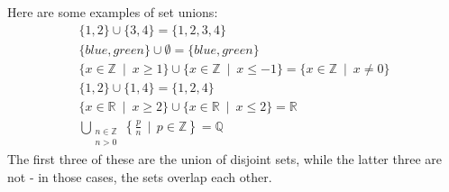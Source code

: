 \documentclass[12pt]{article}
\renewcommand{\geq}{\geqslant}
\renewcommand{\leq}{\leqslant}
\newcommand{\Ints}{\mathbb{Z}}
\newcommand{\Rats}{\mathbb{Q}}
\newcommand{\Reals}{\mathbb{R}}
\begin{document}
Here are some examples of set unions:
\begin{gather*}
\{1,2\}\cup\{3,4\} = \{1,2,3,4\}\\
\{blue, green\}\cup\emptyset = \{blue, green\}\\
\{x\in\Ints\ \mid\ x\geq 1\}\cup\{x\in\Ints\ \mid\ x\leq -1\} = \{x\in\Ints\ \mid\ x\neq 0\}\\
\{1,2\}\cup\{1,4\} = \{1,2,4\}\\
\{x\in\Reals\ \mid\ x\geq 2\}\cup\{x\in\Reals\ \mid\ x\leq 2\} = \Reals\\
\bigcup_{\substack{n\in\Ints\\n>0}} \left\{\frac{p}{n}\,\mid\,p\in\Ints\right\} = \Rats
\end{gather*}
The first three of these are the union of disjoint sets, while the latter three are not - in those cases, the sets overlap each other.
\end{document}
